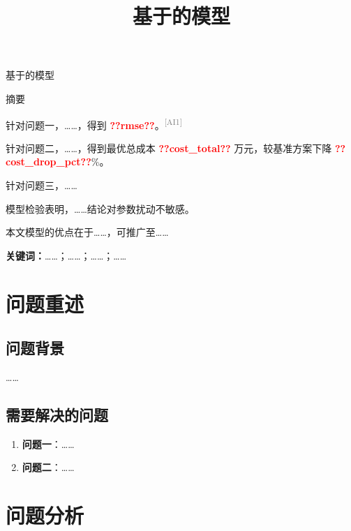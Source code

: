 \documentclass[UTF8,12pt,fontset=windows]{ctexart}
\title{\zihao{3}\heiti 基于\underline{\quad\quad}的\underline{\quad\quad}模型}
\author{}
\date{}
\newcommand{\res}[1]{\textcolor{red}{\textbf{??#1??}}}
\newcommand{\aiflag}[1]{\textsuperscript{\textcolor{gray}{[AI#1]}}}
\begin{document}
\begin{center}
{\heiti 基于\underline{\quad\quad}的\underline{\quad\quad}模型}
\end{center}

\vspace{0.5em}
\begin{center}
{\heiti 摘\quad 要}
\end{center}

针对问题一，……，得到 \res{rmse}。\aiflag{1}

针对问题二，……，得到最优总成本 \res{cost_total} 万元，较基准方案下降 \res{cost_drop_pct}\%。

针对问题三，……

模型检验表明，……结论对参数扰动不敏感。

本文模型的优点在于……，可推广至……

\vspace{0.8em}
\noindent\textbf{关键词：}\quad ……；……；……；……

\newpage


\section{问题重述}

\subsection{问题背景}
……

\subsection{需要解决的问题}
\begin{enumerate}
  \item \textbf{问题一}：……
  \item \textbf{问题二}：……
\end{enumerate}

\section{问题分析}
\end{document}
